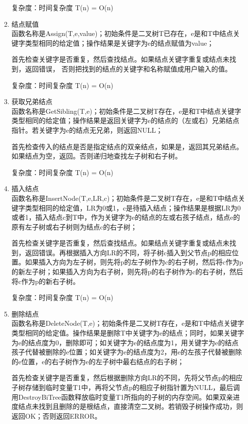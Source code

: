 \documentclass[supercite]{Experimental_Report}
\theoremstyle{definition}
\begin{document}
\begin{enumerate}
	复杂度：时间复杂度 T(n) = O(n)
	
	\item 结点赋值\\
	函数名称是Assign(T,e,value)；初始条件是二叉树T已存在，e是和T中结点关键字类型相同的给定值；操作结果是关键字为e的结点赋值为value；
	
	首先检查关键字是否重复，然后查找结点。如果结点关键字重复或结点未找到，返回错误，
	否则把找到的结点的关键字和名称赋值成用户输入的值。
	
	复杂度：时间复杂度 T(n) = O(n)
	\item 获取兄弟结点\\
	函数名称是GetSibling(T,e)；初始条件是二叉树T存在，e是和T中结点关键字类型相同的给定值；操作结果是返回关键字为e的结点的（左或右）兄弟结点指针。若关键字为e的结点无兄弟，则返回NULL；
	
	首先检查传入的结点是否是指定结点的双亲结点，如果是，返回其兄弟结点。如果结点为空，返回。否则递归地查找左子树和右子树。
	
	复杂度：时间复杂度 T(n) = O(n)
	\item 插入结点\\
	函数名称是InsertNode(T,e,LR,c)；初始条件是二叉树T存在，e是和T中结点关键字类型相同的给定值，LR为0或1，c是待插入结点；操作结果是根据LR为0或者1，插入结点c到T中，作为关键字为e的结点的左或右孩子结点，结点e的原有左子树或右子树则为结点c的右子树；
	
	首先检查关键字是否重复，然后查找结点。如果结点关键字重复或结点未找到，返回错误。再根据插入方向LR的不同，将子树c插入到父节点p的相应位置。如果插入方向为左子树，则先将p的左子树作为c的右子树，然后将c作为p的新左子树；如果插入方向为右子树，则先将p的右子树作为c的右子树，然后将c作为p的新右子树。
	
	复杂度：时间复杂度 T(n) = O(n)
	\item 删除结点\\
	函数名称是DeleteNode(T,e)；初始条件是二叉树T存在，e是和T中结点关键字类型相同的给定值。操作结果是删除T中关键字为e的结点；同时，如果关键字为e的结点度为0，删除即可；如关键字为e的结点度为1，用关键字为e的结点孩子代替被删除的e位置；如关键字为e的结点度为2，用e的左孩子代替被删除的e位置，e的右子树作为e的左子树中最右结点的右子树；
	
	首先检查关键字是否重复，然后根据删除方向LR的不同，先将父节点p的相应子树存储到临时变量T1中，再将父节点p的相应子树指针置为NULL，最后调用DestroyBiTree函数释放临时变量T1所指向的子树的内存空间。如果双亲进度结点未找到且删除的是根结点，直接清空二叉树。若销毁子树操作成功，则返回OK；否则返回ERROR。
	

\end{enumerate}
\end{document}
